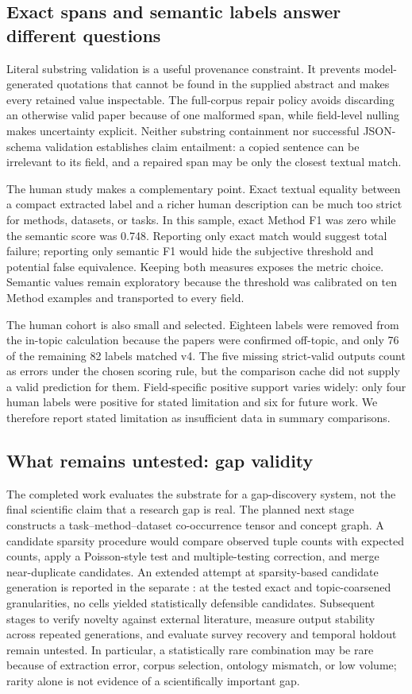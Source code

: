 \documentclass[sigconf,review,anonymous]{acmart}
\begin{document}
\subsection{Exact spans and semantic labels answer different questions}
Literal substring validation is a useful provenance constraint. It prevents model-generated quotations that cannot be found in the supplied abstract and makes every retained value inspectable. The full-corpus repair policy avoids discarding an otherwise valid paper because of one malformed span, while field-level nulling makes uncertainty explicit. Neither substring containment nor successful JSON-schema validation establishes claim entailment: a copied sentence can be irrelevant to its field, and a repaired span may be only the closest textual match.

The human study makes a complementary point. Exact textual equality between a compact extracted label and a richer human description can be much too strict for methods, datasets, or tasks. In this sample, exact Method F1 was zero while the semantic score was 0.748. Reporting only exact match would suggest total failure; reporting only semantic F1 would hide the subjective threshold and potential false equivalence. Keeping both measures exposes the metric choice. Semantic values remain exploratory because the threshold was calibrated on ten Method examples and transported to every field.

The human cohort is also small and selected. Eighteen labels were removed from the in-topic calculation because the papers were confirmed off-topic, and only 76 of the remaining 82 labels matched v4. The five missing strict-valid outputs count as errors under the chosen scoring rule, but the comparison cache did not supply a valid prediction for them. Field-specific positive support varies widely: only four human labels were positive for stated limitation and six for future work. We therefore report stated limitation as insufficient data in summary comparisons.

\subsection{What remains untested: gap validity}
The completed work evaluates the substrate for a gap-discovery system, not the final scientific claim that a research gap is real. The planned next stage constructs a task–method–dataset co-occurrence tensor and concept graph. A candidate sparsity procedure would compare observed tuple counts with expected counts, apply a Poisson-style test and multiple-testing correction, and merge near-duplicate candidates. An extended attempt at sparsity-based candidate generation is reported in the separate \texttt{}: at the tested exact and topic-coarsened granularities, no cells yielded statistically defensible candidates. Subsequent stages to verify novelty against external literature, measure output stability across repeated generations, and evaluate survey recovery and temporal holdout remain untested. In particular, a statistically rare combination may be rare because of extraction error, corpus selection, ontology mismatch, or low volume; rarity alone is not evidence of a scientifically important gap.
\end{document}
